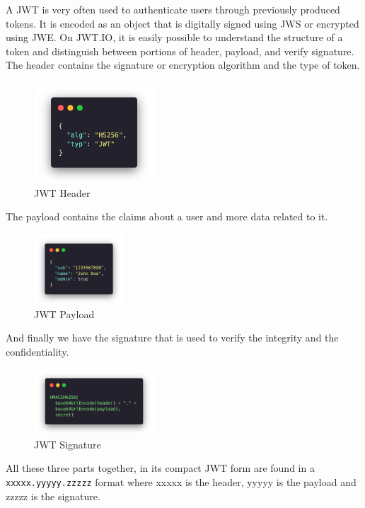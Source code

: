 A JWT is very often used to authenticate users through previously produced
tokens. It is encoded as an object that is digitally signed using JWS or
encrypted using JWE\@. On JWT.IO, it is easily possible to understand the
structure of a token and distinguish between portions of header, payload, and
verify signature. The header contains the signature or encryption algorithm and
the type of token.
\begin{figure}[H]
  \centering
  \includegraphics[width=0.4\textwidth]{figures/code/jwt-header}
  \caption{JWT Header}
  \label{f:jwt-header}
\end{figure}
The payload contains the claims about a user and more data related to it.
\begin{figure}[H]
  \centering
  \includegraphics[width=0.3\textwidth]{figures/code/jwt-payload}
  \caption{JWT Payload}
  \label{f:p}
\end{figure}
And finally we have the signature that is used to verify the integrity and the
confidentiality.
\begin{figure}[H]
  \centering
  \includegraphics[width=0.4\textwidth]{figures/code/jwt-signature}
  \caption{JWT Signature}
  \label{f:jwt-signature}
\end{figure}
All these three parts together, in its compact JWT form are found in a
\lstinline{xxxxx.yyyyy.zzzzz} format where xxxxx is the header, yyyyy is the
payload and zzzzz is the signature.

